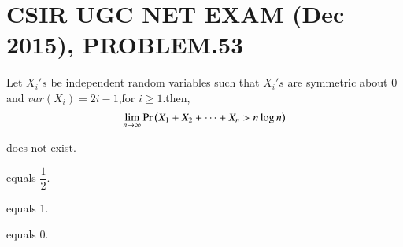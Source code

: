 \documentclass[journal,12pt,twocolumn]{IEEEtran}
\begin{document}
\section{CSIR UGC NET EXAM (Dec 2015), PROBLEM.53}
Let $X_i 's$ be independent random variables such that $X_i 's$ are symmetric about 0 and $var(X_i)=2i - 1$,for $i\geq 1$.then,
$$\lim_{n \to \infty}\Pr\left(X_1 +X_2 + \dots + X_n > n\log{n}\right)$$
\begin{enumerate}
\begin{multicols}{2}
\setlength\itemsep{2em}
\item does not exist.
\item equals $\dfrac{1}{2}$.\\
\item equals 1.
\item equals 0.
\end{multicols}
\end{enumerate}
\end{document}

